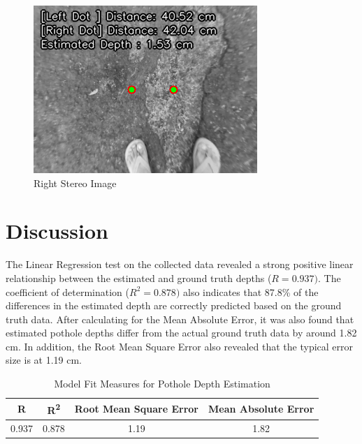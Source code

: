 \begin{figure}[htbp]
\begin{minipage}{0.32\textwidth}
		\includegraphics[width=\textwidth]{right.png}
		\caption{Right Stereo Image}
		\label{fig:image3}
	\end{minipage}
\end{figure}



\section{Discussion}
The Linear Regression test on the collected data revealed a strong positive linear relationship between the estimated and ground truth depths (\(R = 0.937)\). The coefficient of determination (\(R^{2} = 0.878)\) also indicates that 87.8\% of the differences in the estimated depth are correctly predicted based on the ground truth data. After calculating for the Mean Absolute Error, it was also found that estimated pothole depths differ from the actual ground truth data by around 1.82 cm. In addition, the Root Mean Square Error also revealed that the typical error size is at 1.19 cm.

\begin{table}[h]
	\centering
	\begin{tabular}{|c|c|c|c|}
		\hline
		\textbf{R} & \textbf{R\textsuperscript{2}} & \textbf{Root Mean Square Error} & \textbf{Mean Absolute Error} \\
		\hline
		0.937 & 0.878 & 1.19 & 1.82 \\
		\hline
	\end{tabular}
	\caption{Model Fit Measures for Pothole Depth Estimation}
	\label{tab:model_fit}
\end{table}

